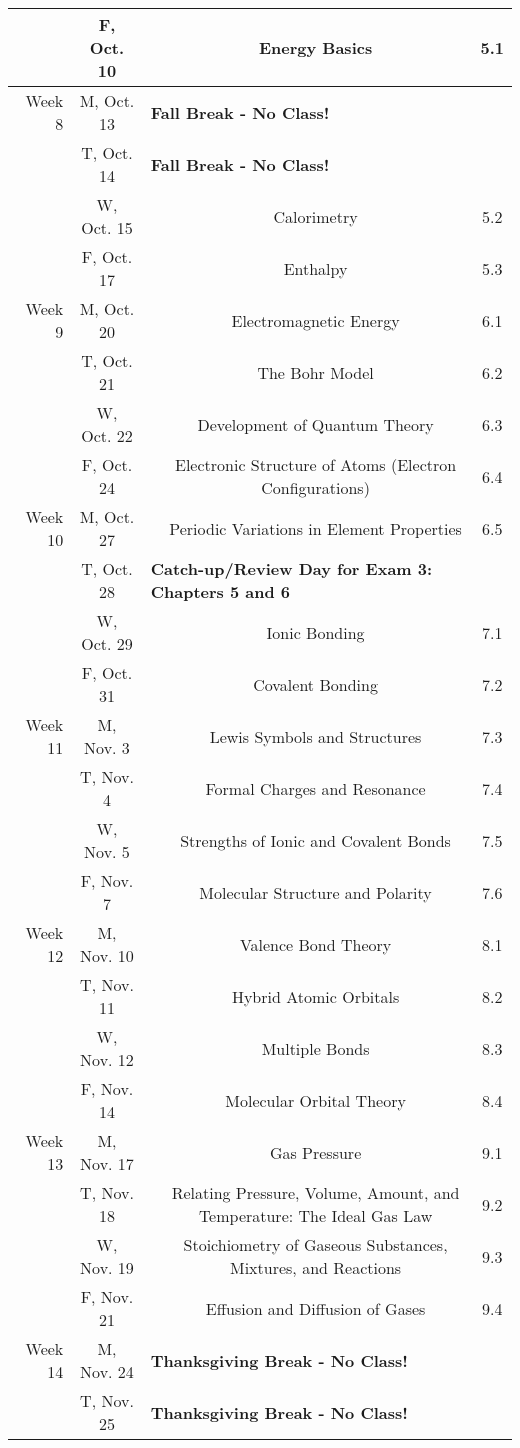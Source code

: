 \begin{tabular}{rcccc}
& F, Oct. 10&& Energy Basics & 5.1\\
\midrule
Week 8 & M, Oct. 13& \multicolumn{3}{l}{\textbf{Fall Break - No Class!}}\\
& T, Oct. 14& \multicolumn{3}{l}{\textbf{Fall Break - No Class!}}\\
& W, Oct. 15&& Calorimetry & 5.2\\
& F, Oct. 17&& Enthalpy & 5.3\\
\midrule
Week 9 & M, Oct. 20&& Electromagnetic Energy & 6.1\\
& T, Oct. 21&& The Bohr Model & 6.2\\
& W, Oct. 22&& Development of Quantum Theory & 6.3\\
& F, Oct. 24&& Electronic Structure of Atoms (Electron Configurations) & 6.4\\
\midrule
Week 10 & M, Oct. 27&& Periodic Variations in Element Properties & 6.5\\
& T, Oct. 28& \multicolumn{3}{l}{\textbf{Catch-up/Review Day for Exam 3: Chapters 5 and 6}}\\
& W, Oct. 29&& Ionic Bonding & 7.1\\
& F, Oct. 31&& Covalent Bonding & 7.2\\
\midrule
Week 11 & M, Nov. 3&& Lewis Symbols and Structures & 7.3\\
& T, Nov. 4&& Formal Charges and Resonance & 7.4\\
& W, Nov. 5&& Strengths of Ionic and Covalent Bonds & 7.5\\
& F, Nov. 7&& Molecular Structure and Polarity & 7.6\\
\midrule
Week 12 & M, Nov. 10&& Valence Bond Theory & 8.1\\
& T, Nov. 11&& Hybrid Atomic Orbitals & 8.2\\
& W, Nov. 12&& Multiple Bonds & 8.3\\
& F, Nov. 14&& Molecular Orbital Theory & 8.4\\
\midrule
Week 13 & M, Nov. 17&& Gas Pressure & 9.1\\
& T, Nov. 18&& Relating Pressure, Volume, Amount, and Temperature: The Ideal Gas Law & 9.2\\
& W, Nov. 19&& Stoichiometry of Gaseous Substances, Mixtures, and Reactions & 9.3\\
& F, Nov. 21&& Effusion and Diffusion of Gases & 9.4\\
\midrule
Week 14 & M, Nov. 24& \multicolumn{3}{l}{\textbf{Thanksgiving Break - No Class!}}\\
& T, Nov. 25& \multicolumn{3}{l}{\textbf{Thanksgiving Break - No Class!}}\\

\end{tabular}
